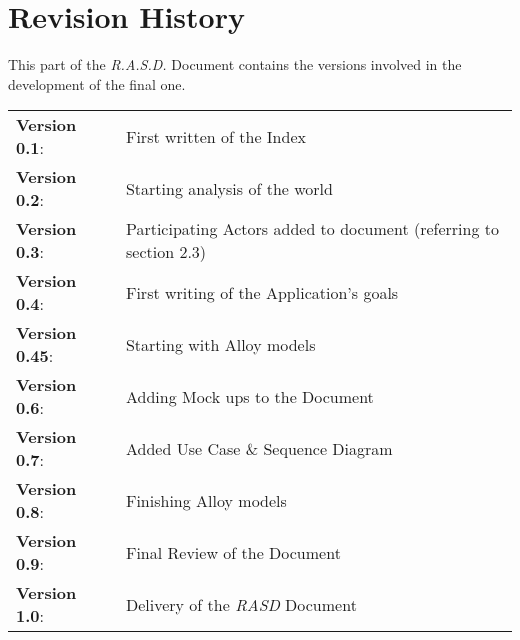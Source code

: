 \section{Revision History}

This part of the \emph{R.A.S.D.} Document contains the versions involved in the development of the final one.

\vspace{10pt}

\begin{tabular}{l l}

	\textbf{Version 0.1}:   & First written of the Index \\
    
    \textbf{Version 0.2}:   & Starting analysis of the world \\

	\textbf{Version 0.3}:   & Participating Actors added to document (referring to section 2.3)\\
    
    \textbf{Version 0.4}:   & First writing of the Application's goals\\
    
    \textbf{Version 0.45}:  & Starting with Alloy models \\
    
    \textbf{Version 0.6}:   & Adding Mock ups to the Document \\
    
    \textbf{Version 0.7}:   & Added Use Case \& Sequence Diagram \\
    
    \textbf{Version 0.8}:   & Finishing Alloy models\\
    
    \textbf{Version 0.9}:   & Final Review of the Document \\
    
    \large{\textbf{Version 1.0}}:   & Delivery of the \emph{RASD} Document \\

\end{tabular}
